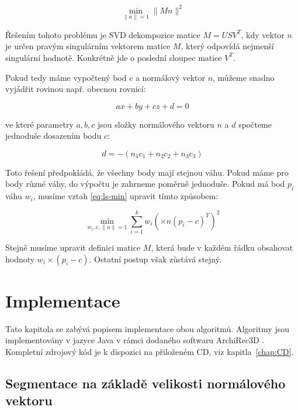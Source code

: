 \documentclass[11pt,twoside,a4paper]{book}
\begin{document}
\begin{equation}
\min_{\|n\|=1} \|M n\|^2
\end{equation}

Řešením tohoto problému je SVD dekompozice matice $M = USV^T$, kdy vektor $n$ je určen pravým singulárním vektorem matice $M$, který odpovídá nejmenší singulární hodnotě. Konkrétně jde o poslední sloupec matice $V^T$.

Pokud tedy máme vypočtený bod $c$ a normálový vektor $n$, můžeme snadno vyjádřit rovinou např. obecnou rovnicí:

\begin{equation}
ax + by + cz + d = 0
\end{equation}

ve které parametry $a, b, c$ jsou složky normálového vektoru $n$ a $d$ spočteme jednoduše dosazením bodu $c$:

\begin{equation}
\label{eq:d}
d = -(n_1c_1 + n_2c_2 + n_3c_3)
\end{equation}

Toto řešení předpokládá, že všechny body mají stejnou váhu. Pokud máme pro body různé váhy, do výpočtu je zahrneme poměrně jednoduše. Pokud má bod $p_i$ váhu $w_i$, musíme vztah \ref{eq:ls-min} upravit tímto způsobem:

\begin{equation}
\min_{w_i,c,\|n\|=1} \sum\limits_{i=1}^k w_i (\times n (p_i - c)^T)^2
\end{equation}

Stejně musíme upravit definici matice $M$, která bude v každém řádku obsahovat hodnoty $w_i \times (p_i - c)$. Ostatní postup však zůstává stejný.

\chapter{Implementace}

Tato kapitola se zabývá popisem implementace obou algoritmů. Algoritmy jsou implementovány v jazyce Java v rámci dodaného softwaru ArchiRec3D \cite{AR3D}. Kompletní zdrojový kód je k dispozici na přiloženém CD, viz kapitla~\ref{chap:CD}.

\section{Segmentace na základě velikosti normálového vektoru}
\end{document}
